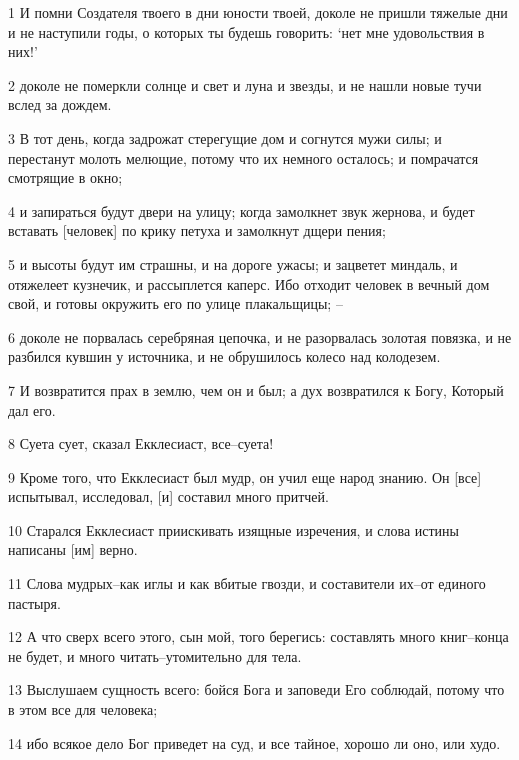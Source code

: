 \par 1 И помни Создателя твоего в дни юности твоей, доколе не пришли тяжелые дни и не наступили годы, о которых ты будешь говорить: `нет мне удовольствия в них!'
\par 2 доколе не померкли солнце и свет и луна и звезды, и не нашли новые тучи вслед за дождем.
\par 3 В тот день, когда задрожат стерегущие дом и согнутся мужи силы; и перестанут молоть мелющие, потому что их немного осталось; и помрачатся смотрящие в окно;
\par 4 и запираться будут двери на улицу; когда замолкнет звук жернова, и будет вставать [человек] по крику петуха и замолкнут дщери пения;
\par 5 и высоты будут им страшны, и на дороге ужасы; и зацветет миндаль, и отяжелеет кузнечик, и рассыплется каперс. Ибо отходит человек в вечный дом свой, и готовы окружить его по улице плакальщицы; --
\par 6 доколе не порвалась серебряная цепочка, и не разорвалась золотая повязка, и не разбился кувшин у источника, и не обрушилось колесо над колодезем.
\par 7 И возвратится прах в землю, чем он и был; а дух возвратился к Богу, Который дал его.
\par 8 Суета сует, сказал Екклесиаст, все--суета!
\par 9 Кроме того, что Екклесиаст был мудр, он учил еще народ знанию. Он [все] испытывал, исследовал, [и] составил много притчей.
\par 10 Старался Екклесиаст приискивать изящные изречения, и слова истины написаны [им] верно.
\par 11 Слова мудрых--как иглы и как вбитые гвозди, и составители их--от единого пастыря.
\par 12 А что сверх всего этого, сын мой, того берегись: составлять много книг--конца не будет, и много читать--утомительно для тела.
\par 13 Выслушаем сущность всего: бойся Бога и заповеди Его соблюдай, потому что в этом все для человека;
\par 14 ибо всякое дело Бог приведет на суд, и все тайное, хорошо ли оно, или худо.


